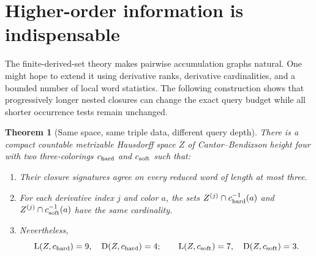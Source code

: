 \documentclass[11pt,letterpaper]{article}
\numberwithin{equation}{section}
\newtheorem{theorem}{Theorem}[section]
\theoremstyle{definition}
\theoremstyle{remark}
\theoremstyle{definition}
\newcommand{\depth}{\operatorname{D}}
\newcommand{\layers}{\operatorname{L}}
\begin{document}
\section{Higher-order information is indispensable}
\label{cw:sec:example}

The finite-derived-set theory makes pairwise accumulation graphs natural.
One might hope to extend it using derivative ranks, derivative cardinalities,
and a bounded number of local word statistics. The following construction
shows that progressively longer nested closures can change the exact query
budget while all shorter occurrence tests remain unchanged.

\begin{theorem}[Same space, same triple data, different query depth]
\label{cw:thm:separationexample}
There is a compact countable metrizable Hausdorff space $Z$ of
Cantor--Bendixson height four with two three-colorings $c_{\rm hard}$ and
$c_{\rm soft}$ such that:
\begin{enumerate}[label=(\roman*)]
\item Their closure signatures agree on every reduced word of length at most
three.
\item For each derivative index $j$ and color $a$, the sets
$Z^{(j)}\cap c_{\rm hard}^{-1}(a)$ and
$Z^{(j)}\cap c_{\rm soft}^{-1}(a)$ have the same cardinality.
\item Nevertheless,
\begin{equation}\label{cw:eq:examplevalues}
 \layers(Z,c_{\rm hard})=9,\quad \depth(Z,c_{\rm hard})=4;
 \qquad
 \layers(Z,c_{\rm soft})=7,\quad \depth(Z,c_{\rm soft})=3.
\end{equation}
\end{enumerate}
\end{theorem}
\end{document}

